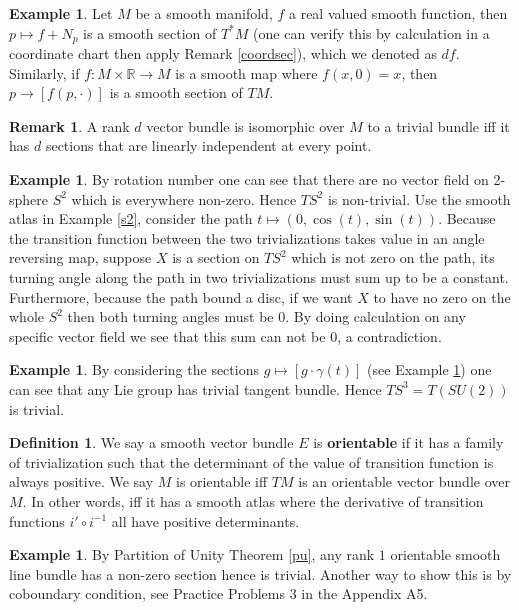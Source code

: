\documentclass{article}
\theoremstyle{definition}
\newtheorem{dfn}[thm]{Definition}
\newtheorem{rmk}[thm]{Remark}
\newtheorem{exm}[thm]{Example}
\begin{document}
\begin{exm}\label{exmsec}
    Let $M$ be a smooth manifold, $f$ a real valued smooth function, then $p\mapsto f+N_p$ is a smooth section of $T^*M$ (one can verify this by calculation in a coordinate chart then apply Remark \ref{coordsec}), which we denoted as $df$. Similarly, if $f: M\times\mathbb{R}\rightarrow M$ is a smooth map where $f(x, 0)=x$, then $p\rightarrow [f(p, \cdot)]$ is a smooth section of $TM$.
\end{exm}

\begin{rmk}
   A rank $d$ vector bundle is isomorphic over $M$ to a trivial bundle iff it has $d$ sections that are linearly independent at every point.
\end{rmk}

\begin{exm}\label{ts2}
By rotation number one can see that there are no vector field on 2-sphere $S^2$ which is everywhere non-zero. Hence $TS^2$ is non-trivial. Use the smooth atlas in Example \ref{s2}, consider the path $t\mapsto (0, \cos(t), \sin(t))$. Because the transition function between the two trivializations takes value in an angle reversing map, suppose $X$ is a section on $TS^2$ which is not zero on the path, its turning angle along the path in two trivializations must sum up to be a constant. Furthermore, because the path bound a disc, if we want $X$ to have no zero on the whole $S^2$ then both turning angles must be $0$. By doing calculation on any specific vector field we see that this sum can not be $0$, a contradiction.
\end{exm}

\begin{exm}
    By considering the sections $g\mapsto [g\cdot \gamma(t)]$ (see Example \ref{exmsec}) one can see that any Lie group has trivial tangent bundle. Hence $TS^3=T(SU(2))$ is trivial.
\end{exm}

\begin{dfn}
    We say a smooth vector bundle $E$ is {\bf orientable} if it has a family of trivialization such that the determinant of the value of transition function is always positive. We say $M$ is orientable iff $TM$ is an orientable vector bundle over $M$. In other words, iff it has a smooth atlas where the derivative of transition functions $i'\circ i^{-1}$ all have positive determinants.
\end{dfn}

\begin{exm}
    By Partition of Unity Theorem \ref{pu}, any rank $1$ orientable smooth line bundle has a non-zero section hence is trivial. Another way to show this is by coboundary condition, see Practice Problems 3 in the Appendix A5.
\end{exm}
\end{document}
